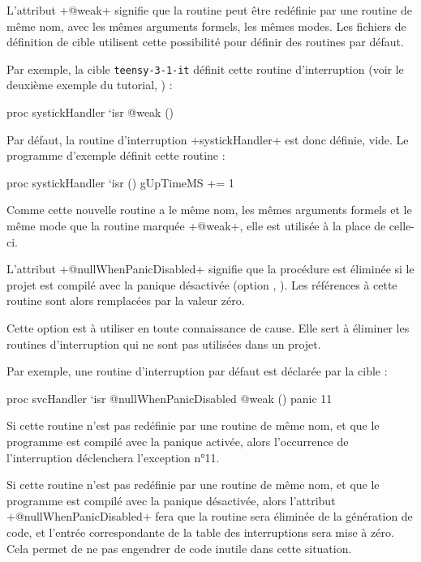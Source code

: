 L'attribut \plm+@weak+ signifie que la routine peut être redéfinie par une routine de même nom, avec les mêmes arguments formels, les mêmes modes. Les fichiers de définition de cible utilisent cette possibilité pour définir des routines par défaut.

Par exemple, la cible \texttt{teensy-3-1-it} définit cette routine d'interruption (voir le deuxième exemple du tutorial, ) :

\begin{PLM}
proc systickHandler `isr @weak () {
}
\end{PLM}

Par défaut, la routine d'interruption \plm+systickHandler+ est donc définie, vide. Le programme d'exemple définit cette routine :

\begin{PLM}
proc systickHandler `isr () {
  gUpTimeMS += 1
}
\end{PLM}

Comme cette nouvelle routine a le même nom, les mêmes arguments formels et le même mode que la routine marquée \plm+@weak+, elle est utilisée à la place de celle-ci.







L'attribut \plm+@nullWhenPanicDisabled+ signifie que la procédure est éliminée si le projet est compilé avec la panique désactivée (option , ). Les références à cette routine sont alors remplacées par la valeur zéro.

Cette option est à utiliser en toute connaissance de cause. Elle sert à éliminer les routines d'interruption qui ne sont pas utilisées dans un projet.

Par exemple, une routine d'interruption par défaut est déclarée par la cible :

\begin{PLM}
proc svcHandler `isr @nullWhenPanicDisabled @weak () {
  panic 11
}
\end{PLM}

Si cette routine n'est pas redéfinie par une routine de même nom, et que le programme est compilé avec la panique activée, alors l'occurrence de l'interruption déclenchera l'exception n°11.

Si cette routine n'est pas redéfinie par une routine de même nom, et que le programme est compilé avec la panique désactivée, alors l'attribut \plm+@nullWhenPanicDisabled+ fera que la routine sera éliminée de la génération de code, et l'entrée correspondante de la table des interruptions sera mise à zéro. Cela permet de ne pas engendrer de code inutile dans cette situation.

